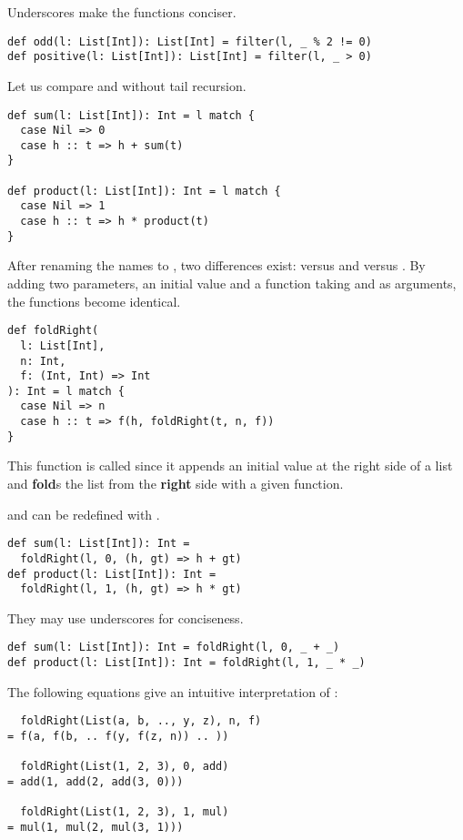 Underscores make the functions conciser.

\begin{verbatim}
def odd(l: List[Int]): List[Int] = filter(l, _ % 2 != 0)
def positive(l: List[Int]): List[Int] = filter(l, _ > 0)
\end{verbatim}

Let us compare  and  without tail recursion.

\begin{verbatim}
def sum(l: List[Int]): Int = l match {
  case Nil => 0
  case h :: t => h + sum(t)
}

def product(l: List[Int]): Int = l match {
  case Nil => 1
  case h :: t => h * product(t)
}
\end{verbatim}

After renaming the names to , two differences exist:  versus
 and  versus . By adding two parameters, an
initial value and a function taking  and  as arguments, the
functions become identical.

\begin{verbatim}
def foldRight(
  l: List[Int],
  n: Int,
  f: (Int, Int) => Int
): Int = l match {
  case Nil => n
  case h :: t => f(h, foldRight(t, n, f))
}
\end{verbatim}

This function is called  since it
appends an initial value at the right side of a list and
\textbf{fold}s the list from the \textbf{right} side with a given function.

 and  can be redefined with .

\begin{verbatim}
def sum(l: List[Int]): Int =
  foldRight(l, 0, (h, gt) => h + gt)
def product(l: List[Int]): Int =
  foldRight(l, 1, (h, gt) => h * gt)
\end{verbatim}

They may use underscores for conciseness.

\begin{verbatim}
def sum(l: List[Int]): Int = foldRight(l, 0, _ + _)
def product(l: List[Int]): Int = foldRight(l, 1, _ * _)
\end{verbatim}

The following equations give an intuitive interpretation of :

\begin{verbatim}
  foldRight(List(a, b, .., y, z), n, f)
= f(a, f(b, .. f(y, f(z, n)) .. ))

  foldRight(List(1, 2, 3), 0, add)
= add(1, add(2, add(3, 0)))

  foldRight(List(1, 2, 3), 1, mul)
= mul(1, mul(2, mul(3, 1)))
\end{verbatim}

